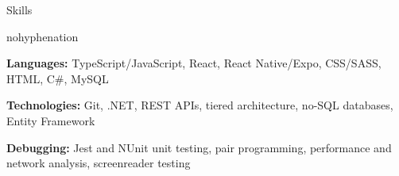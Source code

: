 \documentclass[
	11pt, %
]{article} %
\begin{document}
\printname

\begin{rSection}{Skills}
	\begin{hyphenrules}{nohyphenation}

		\begin{rSubsection}{}{}{}{}
			\item \textbf{Languages:} TypeScript/JavaScript, React, React Native/Expo, CSS/SASS, HTML, C\#, MySQL
			\item \textbf{Technologies:} Git, .NET, REST APIs, tiered architecture, no-SQL databases, Entity Framework
			\item \textbf{Debugging:} Jest and NUnit unit testing, pair programming, performance and network analysis, screenreader testing
		\end{rSubsection}

	\end{hyphenrules}
\end{rSection}
\end{document}
